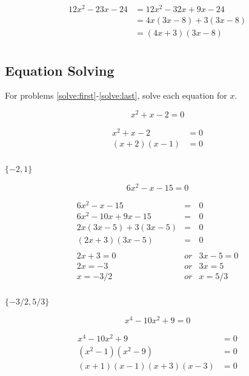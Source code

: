 \documentclass[fleqn,addpoints]{exam}
\begin{document}
\begin{questions}
\begin{solution}[4 cm]
\begin{align*}
  12x^2 - 23x - 24 &= 12x^2 - 32x + 9x - 24 \\
  &= 4x(3x - 8) + 3(3x - 8) \\
  &= (4x + 3)(3x - 8) \\
\end{align*}

\end{solution}

\subsection{Equation Solving}

For problems \ref{solve:first}-\ref{solve:last}, solve each equation for $x$.

\question[5]
\label{solve:first}
\[ x^2 + x - 2 = 0 \]
\begin{solution}[4 cm]

\begin{align*}
  x^2 + x - 2 &= 0 \\
  (x + 2)(x - 1) &= 0 \\
\end{align*}

$\{-2, 1\}$

\end{solution}

\question[5]
\[ 6x^2 - x - 15 = 0 \]
\begin{solution}[4 cm]

\begin{eqnarray*}
  6x^2 - x - 15 &=& 0 \\
  6x^2 - 10x + 9x - 15 &=& 0 \\
  2x(3x - 5) + 3(3x - 5) &=& 0 \\
  (2x + 3)(3x - 5) &=& 0 \\
  \\
  2x + 3 = 0 &or& 3x - 5 = 0 \\
  2x = -3 &or& 3x  = 5 \\
  x = -3/2 &or& x  = 5/3 \\
\end{eqnarray*}

$ \{-3/2, 5/3 \}$

\end{solution}


\question[5]
\[ x^4 - 10x^2 + 9 = 0 \]
\begin{solution}[5 cm]

\begin{align*}
  x^4 - 10x^2 + 9 &= 0 \\
  (x^2 - 1)(x^2 - 9) &= 0 \\
  (x + 1)(x - 1)(x + 3)(x - 3) &= 0 \\
\end{align*}


\end{solution}
\end{questions}
\end{document}
